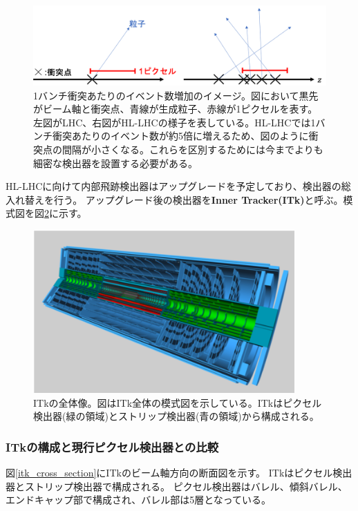 \begin{figure}[bpt]\centering
\includegraphics[width=12cm]{./detector_posi_res.png}
\caption[1バンチ衝突あたりのイベント数増加のイメージ]{1バンチ衝突あたりのイベント数増加のイメージ。図において黒先がビーム軸と衝突点、青線が生成粒子、赤線が1ピクセルを表す。左図がLHC、右図がHL-LHCの様子を表している。HL-LHCでは1バンチ衝突あたりのイベント数が約5倍に増えるため、図のように衝突点の間隔が小さくなる。これらを区別するためには今までよりも細密な検出器を設置する必要がある。}
\label{detector_posi_res}
\end{figure}

HL-LHCに向けて内部飛跡検出器はアップグレードを予定しており、検出器の総入れ替えを行う。
アップグレード後の検出器を\textbf{Inner Tracker(ITk)}と呼ぶ。模式図を図\ref{itk_image}に示す。

\begin{figure}[bpt]\centering
\includegraphics[width=10cm]{./itk_image.png}
\caption[ITkの全体像]{ITkの全体像\cite{1-3}。図はITk全体の模式図を示している。ITkはピクセル検出器(緑の領域)とストリップ検出器(青の領域)から構成される。}
\label{itk_image}
\end{figure}

\subsubsection{ITkの構成と現行ピクセル検出器との比較}
図\ref{itk_cross_section}にITkのビーム軸方向の断面図を示す。
ITkはピクセル検出器とストリップ検出器で構成される。
ピクセル検出器はバレル、傾斜バレル、エンドキャップ部で構成され、バレル部は5層となっている。

